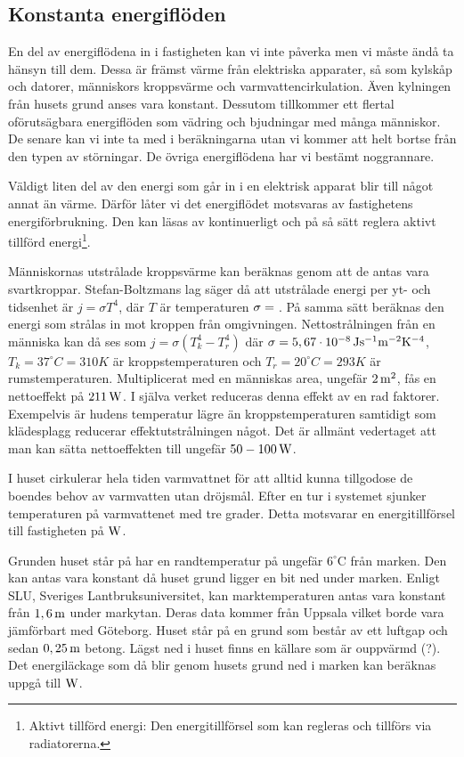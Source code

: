 \subsection{Konstanta energiflöden}

En del av energiflödena in i fastigheten kan vi inte påverka men vi måste ändå ta hänsyn till dem. Dessa är främst värme från elektriska apparater, så som kylskåp och datorer, människors kroppsvärme och varmvattencirkulation. Även kylningen från husets grund anses vara konstant. Dessutom tillkommer ett flertal oförutsägbara energiflöden som vädring och bjudningar med många människor. De senare kan vi inte ta med i beräkningarna utan vi kommer att helt bortse från den typen av störningar. De övriga energiflödena har vi bestämt noggrannare.

Väldigt liten del av den energi som går in i en elektrisk apparat blir till något annat än värme. Därför låter vi det energiflödet motsvaras av fastighetens energiförbrukning. Den kan läsas av kontinuerligt och på så sätt reglera aktivt tillförd energi\footnote{Aktivt tillförd energi: Den energitillförsel som kan regleras och tillförs via radiatorerna.}.

Människornas utstrålade kroppsvärme kan beräknas genom att de antas vara svartkroppar. Stefan-Boltzmans lag säger då att utstrålade energi per yt- och tidsenhet är $j=\sigma T^4$, där $T$ är temperaturen $\sigma=\unit[]{}$. På samma sätt beräknas den energi som strålas in mot kroppen från omgivningen. Nettostrålningen från en människa kan då ses som $j=\sigma \left( T_k^4 - T_r^4 \right)$ där $\sigma=\unit[5,67\cdot10^{-8}]{Js^{-1}m^{-2}K^{-4}}$, $T_k=37^{\circ}C=310K$ är kroppstemperaturen och $T_r=20^{\circ}C=293K$ är rumstemperaturen. Multiplicerat med en människas area, ungefär $\unit[2]{m^2}$, fås en nettoeffekt på $\unit[211]{W}$. I själva verket reduceras denna effekt av en rad faktorer. Exempelvis är hudens temperatur lägre än kroppstemperaturen samtidigt som klädesplagg reducerar effektutstrålningen något. Det är allmänt vedertaget att man kan sätta nettoeffekten till ungefär $\unit[50-100]{W}$.

I huset cirkulerar hela tiden varmvattnet för att alltid kunna tillgodose de boendes behov av varmvatten utan dröjsmål. Efter en tur i systemet sjunker temperaturen på varmvattenet med tre grader. Detta motsvarar en energitillförsel till fastigheten på $\unit[]{W}$.

Grunden huset står på har en randtemperatur på ungefär $6^{\circ}\mbox{C}$ från marken. Den kan antas vara konstant då huset grund ligger en bit ned under marken. Enligt SLU, Sveriges Lantbruksuniversitet, kan marktemperaturen antas vara konstant från $\unit[1,6]{m}$ under markytan\cite{SLU}. Deras data kommer från Uppsala vilket borde vara jämförbart med Göteborg. Huset står på en grund som består av ett luftgap och sedan $\unit[0,25]{m}$ betong. Lägst ned i huset finns en källare som är ouppvärmd (?). Det energiläckage som då blir genom husets grund ned i marken kan beräknas uppgå till $\unit[]{W}$.
